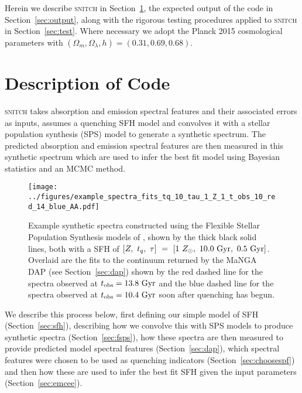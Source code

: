 \documentclass[useAMS,usenatbib]{mn2e}
\begin{document}


Herein we describe \textsc{snitch} in Section~\ref{sec:code}, the expected output of the code in Section~\ref{sec:output}, along with the rigorous testing procedures applied to \textsc{snitch} in Section~\ref{sec:test}. Where necessary we adopt the Planck 2015 \citep{planck16} cosmological parameters with $(\Omega_m, \Omega_{\lambda}, h) = (0.31, 0.69, 0.68)$. 

\section{Description of Code}\label{sec:code}

\textsc{snitch} takes absorption and emission spectral features and their associated errors as inputs, assumes a quenching SFH model and convolves it with a stellar population synthesis (SPS) model to generate a synthetic spectrum. The predicted absorption and emission spectral features are then measured in this synthetic spectrum which are used to infer the best fit model using Bayesian statistics and an MCMC method. 

\begin{figure*}
\centering
\texttt{[image: ../figures/example\_spectra\_fits\_tq\_10\_tau\_1\_Z\_1\_t\_obs\_10\_red\_14\_blue\_AA.pdf]}
\caption{Example synthetic spectra constructed using the Flexible Stellar Population Synthesis models of \citeauthor[][see Section~\ref{sec:fsps}]{conroy09}, shown by the thick black solid lines, both with a SFH of $[Z,~t_q,~\tau]~=~[1~Z_{\odot},~10.0~\rm{Gyr},~0.5~\rm{Gyr}]$. Overlaid are the fits to the continuum returned by the MaNGA DAP (see Section~\ref{sec:dap}) shown by the red dashed line for the spectra observed at $t_{\rm{obs}} = 13.8~\rm{Gyr}$ and the blue dashed line for the spectra observed at $t_{\rm{obs}} = 10.4~\rm{Gyr}$ soon after quenching has begun.}
\label{fig:spectrafit}
\end{figure*}

We describe this process below, first defining our simple model of SFH (Section~\ref{sec:sfh}), describing how we convolve this with SPS models to produce synthetic spectra (Section~\ref{sec:fsps}), how these spectra are then measured to provide predicted model spectral features (Section~\ref{sec:dap}), which spectral features were chosen to be used as quenching indicators (Section~\ref{sec:choosespf}) and then how these are used to infer the best fit SFH given the input parameters (Section~\ref{sec:emcee}). 
\end{document}
